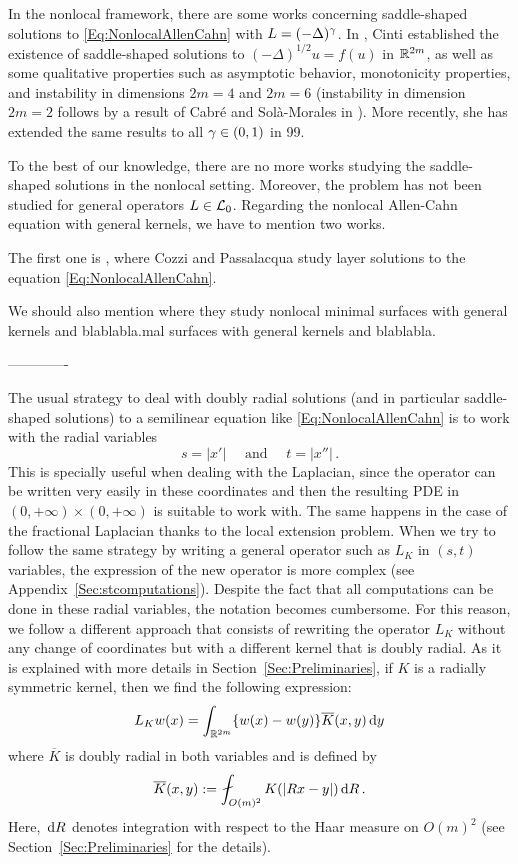 In the nonlocal framework, there are some works concerning saddle-shaped solutions to \eqref{Eq:NonlocalAllenCahn} with $L= (-\Delta)^\gamma$. In  \cite{Cinti-Saddle}, Cinti established the existence of saddle-shaped solutions to $(-\Delta)^{1/2}u = f(u)$ in $\mathbb{R}^{2m}$, as well as some qualitative properties such as asymptotic behavior, monotonicity properties, and instability in dimensions $2m = 4$ and $2m = 6$ (instability in dimension $2m=2$ follows by a result of Cabré and Solà-Morales in \cite{CabreSolaMorales}). More recently, she has extended the same results to all $\gamma \in (0,1)$ in 99.


To the best of our knowledge, there are no more works studying the saddle-shaped solutions in the nonlocal setting. Moreover, the problem has not been studied for general operators $L\in \mathcal{L}_0$. Regarding the nonlocal Allen-Cahn equation with general kernels, we have to mention two works.

The first one is \cite{CozziPassalacqua}, where Cozzi and Passalacqua study layer solutions to the equation \eqref{Eq:NonlocalAllenCahn}.

We should also mention \cite{DipierroSerraValdinoci} where they study nonlocal minimal surfaces with general kernels and blablabla.mal surfaces with general kernels and blablabla.



\bigskip
\bigskip
\bigskip
-------------
\bigskip
\bigskip
\bigskip

The usual strategy to deal with doubly radial solutions (and in particular saddle-shaped solutions) to a semilinear equation like \eqref{Eq:NonlocalAllenCahn} is to work with the radial variables 
$$
s = |x'| \quad \text{ and } \quad t=|x''|\,.
$$
This is specially useful when dealing with the Laplacian, since the operator can be written very easily in these coordinates and then the resulting PDE in $(0,+\infty)\times (0,+\infty)$ is suitable to work with. The same happens in the case of the fractional Laplacian thanks to the local extension problem. When we try to follow the same strategy by writing a general operator such as $L_K$ in $(s,t)$ variables, the expression of the new operator is more complex (see Appendix~\ref{Sec:stcomputations}). Despite the fact that all computations can be done in these radial variables, the notation becomes cumbersome. For this reason, we follow a different approach that consists of rewriting the operator $L_K$ without any change of coordinates but with a different kernel that is doubly radial. As it is explained with more details in Section~\ref{Sec:Preliminaries}, if $K$ is a radially symmetric kernel, then we find the following expression:
$$
L_K w(x) = \int_{\mathbb{R}^{2m}} \{w(x) - w(y)\} \overline{K}(x,y) \,\mathrm{d} y
$$
where $\overline{K}$ is doubly radial in both variables and is defined by
\begin{equation}
\label{Eq:KbarDef'}
\overline{K}(x,y) := \average_{O(m)^2} K(|Rx - y|)\d R\,.
\end{equation}
Here, $\,\mathrm{d} R$ denotes integration with respect to the Haar measure on $O(m)^2$ (see Section~\ref{Sec:Preliminaries} for the details).


